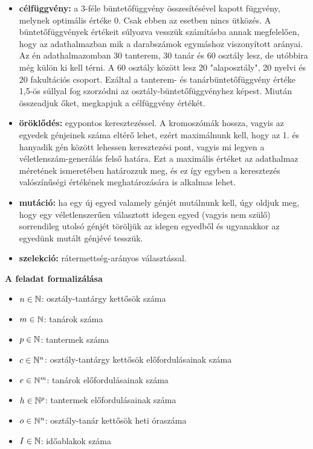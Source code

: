 \documentclass[a4paper,12pt]{article}
\begin{document}
\begin{itemize}
    \item \textbf{célfüggvény:} a 3-féle büntetőfüggvény összesítésével kapott függvény, melynek optimális
              értéke 0. Csak ebben az esetben nincs ütközés. A büntetőfüggvények értékeit
              súlyozva vesszük számításba annak megfelelően, hogy az adathalmazban mik
              a darabszámok egymáshoz viszonyított arányai. Az én adathalmazomban 30 tanterem,
              30 tanár és 60 osztály lesz, de utóbbira még külön ki kell térni. A 60 osztály
              között lesz 20 "alaposztály", 20 nyelvi és 20 fakultációs csoport. Ezáltal a tanterem- és
              tanárbüntetőfüggvény értéke 1,5-ös súllyal fog szorzódni az osztály-büntetőfüggvényhez
              képest. Miután összeadjuk őket, megkapjuk a célfüggvény értékét.
    \item \textbf{öröklődés:} egypontos keresztezéssel. A kromoszómák hossza, vagyis az egyedek génjeinek
            száma eltérő lehet, ezért maximálnunk kell, hogy az 1. és hanyadik gén között
            lehessen keresztezési pont, vagyis mi legyen a véletlenszám-generálás felső
            határa. Ezt a maximális értéket az adathalmaz méretének ismeretében határozzuk
            meg, és ez így egyben a keresztezés valószínűségi értékének meghatározására is
            alkalmas lehet.
    \item \textbf{mutáció:} ha egy új egyed valamely génjét mutálnunk kell, úgy oldjuk meg, hogy egy
          véletlenszerűen választott idegen egyed (vagyis nem szülő) sorrendileg utolsó
          génjét töröljük az idegen egyedből és ugyanakkor az egyedünk mutált génjévé
          tesszük.
    \item \textbf{szelekció:} rátermettség-arányos választással.
\end{itemize}

\noindent \textbf{A feladat formalizálása}

\begin{itemize}
    \item $n \in \Bbb{N}$: osztály-tantárgy kettősök száma
    \item $m \in \Bbb{N}$: tanárok száma
    \item $p \in \Bbb{N}$: tantermek száma
    \item $c \in \Bbb{N}^n$: osztály-tantárgy kettősök előfordulásainak száma
    \item $e \in \Bbb{N}^m$: tanárok előfordulásainak száma
    \item $h \in \Bbb{N}^p$: tantermek előfordulásainak száma
    \item $o \in \Bbb{N}^n$: osztály-tanár kettősök heti óraszáma
    \item $I \in \Bbb{N}$: időablakok száma
\end{itemize}
\end{document}
